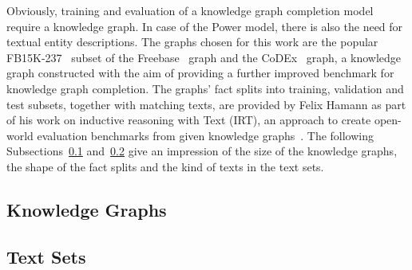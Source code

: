 Obviously, training and evaluation of a knowledge graph completion model require a knowledge graph. In case of the Power model, there is also the need for textual entity descriptions. The graphs chosen for this work are the popular FB15K-237~\cite{Toutanova2015ObservedVL} subset of the  Freebase~\cite{Bollacker2008FreebaseAC} graph and the CoDEx~\cite{Safavi2020CoDExAC} graph, a knowledge graph constructed with the aim of providing a further improved benchmark for knowledge graph completion. The graphs' fact splits into training, validation and test subsets, together with matching texts, are provided by Felix Hamann as part of his work on inductive reasoning with Text (IRT), an approach to create open-world evaluation benchmarks from given knowledge graphs~\cite{}. The following Subsections~\ref{subsec:5_experiments/1_data_sources/1_knowledge_graphs} and~\ref{subsec:5_experiments/1_data_sources/2_text_sets} give an impression of the size of the knowledge graphs, the shape of the fact splits and the kind of texts in the text sets.

\subsection{Knowledge Graphs}
\label{subsec:5_experiments/1_data_sources/1_knowledge_graphs}


\subsection{Text Sets}
\label{subsec:5_experiments/1_data_sources/2_text_sets}

